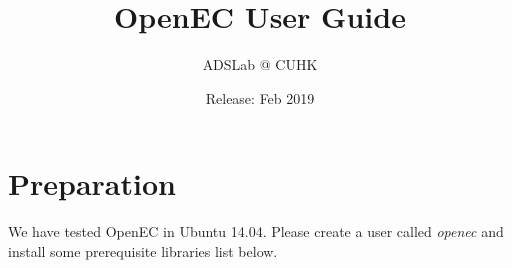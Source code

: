 \documentclass[letterpaper,12pt]{article}
\title{{\bf OpenEC User Guide}}
\author{ADSLab @ CUHK}
\date{Release: Feb 2019\\}
\newcommand{\openec}{{\sf\small OpenEC}\xspace}
\begin{document}
\maketitle


\tableofcontents

\clearpage

\section{Preparation}
\label{sec:installation}

We have tested \openec in Ubuntu 14.04. Please create a user called {\sl openec} and
install some prerequisite libraries list below.
\end{document}
